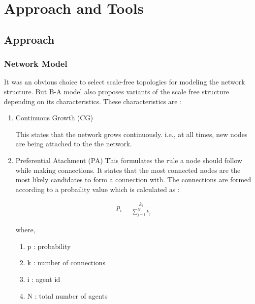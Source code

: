 
\chapter{Approach and Tools} %

\label{Chapter2} %



\section{Approach}


\subsection{Network Model}
\label{sec:model}
It was an obvious choice to select scale-free topologies for modeling the network structure.  But B-A model also proposes variants of the scale free structure depending on its characteristics. These characteristics are : 

\begin{enumerate}
\item Continuous Growth (CG)

This states that the network grows continuously. i.e., at all times, new nodes are being attached to the the network.


\item Preferential Atachment (PA)
This formulates the rule a node should follow while making connections. It states that the most connected nodes are the most likely candidates to form a connection with.
The connections are formed according to a probaility value which is calculated as :

\begin{eqnarray}
 p_i = \frac{k_i}{\sum_{j=1}^{N} k_j} 
\label{eqn:PA}
\end{eqnarray}


where, 

\begin{enumerate}
\item p : probability 
\item k : number of connections 
\item i : agent id 
\item N : total number of agents 
\end{enumerate}

\end{enumerate} 


